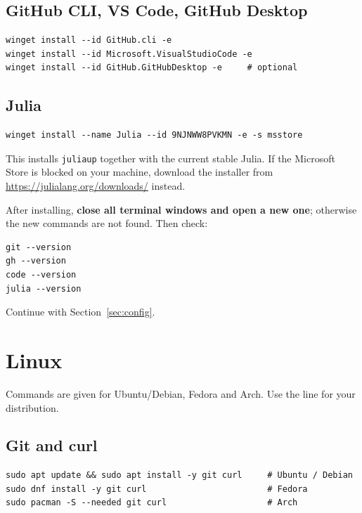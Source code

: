 \documentclass[11pt,a4paper]{article}
\newcommand{\cmd}[1]{\texttt{#1}}
\begin{document}
\subsection{GitHub CLI, VS Code, GitHub Desktop}
\begin{lstlisting}
winget install --id GitHub.cli -e
winget install --id Microsoft.VisualStudioCode -e
winget install --id GitHub.GitHubDesktop -e     # optional
\end{lstlisting}

\subsection{Julia}
\begin{lstlisting}
winget install --name Julia --id 9NJNWW8PVKMN -e -s msstore
\end{lstlisting}
This installs \cmd{juliaup} together with the current stable Julia. If the Microsoft
Store is blocked on your machine, download the installer from
\url{https://julialang.org/downloads/} instead.

\begin{warn}
After installing, \textbf{close all terminal windows and open a new one}; otherwise the
new commands are not found. Then check:
\begin{lstlisting}
git --version
gh --version
code --version
julia --version
\end{lstlisting}
\end{warn}

Continue with Section~\ref{sec:config}.

\section{Linux}\label{sec:linux}

Commands are given for Ubuntu/Debian, Fedora and Arch. Use the line for your
distribution.

\subsection{Git and curl}
\begin{lstlisting}
sudo apt update && sudo apt install -y git curl     # Ubuntu / Debian
sudo dnf install -y git curl                        # Fedora
sudo pacman -S --needed git curl                    # Arch
\end{lstlisting}
\end{document}
